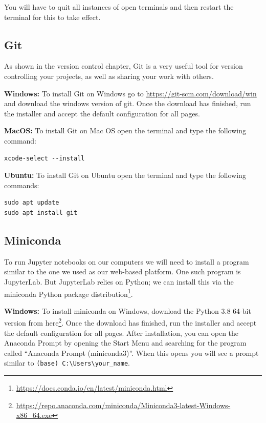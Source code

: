 \documentclass[
]{krantz}
\renewcommand{\href}[2]{#2\footnote{\url{#1}}}
\begin{document}
You will have to quit all instances of open terminals and then restart the
terminal for this to take effect.

\hypertarget{git}{%
\subsection{Git}\label{git}}

As shown in the version control chapter, Git is a very useful tool for version
controlling your projects, as well as sharing your work with others.

\textbf{Windows:} To install
Git on Windows go to \url{https://git-scm.com/download/win} and download the windows
version of git. Once the download has finished, run the installer and accept
the default configuration for all pages.

\textbf{MacOS:} To install Git on Mac OS open the terminal and type the following command:

\begin{verbatim}
xcode-select --install
\end{verbatim}

\textbf{Ubuntu:} To install Git on Ubuntu open the terminal and type the following commands:

\begin{verbatim}
sudo apt update
sudo apt install git
\end{verbatim}

\hypertarget{miniconda}{%
\subsection{Miniconda}\label{miniconda}}

To run Jupyter notebooks on our computers we will need to install a program
similar to the one we used as our web-based platform. One such program is
JupyterLab. But JupyterLab relies on Python; we can install this via
the \href{https://docs.conda.io/en/latest/miniconda.html}{miniconda Python package distribution}.

\textbf{Windows:} To install miniconda on Windows, download
the \href{https://repo.anaconda.com/miniconda/Miniconda3-latest-Windows-x86_64.exe}{Python 3.8 64-bit version from here}.
Once the download has finished, run the installer and accept the default
configuration for all pages. After installation, you can open the Anaconda Prompt
by opening the Start Menu and searching for the program called
``Anaconda Prompt (miniconda3)''. When this opens you will see a prompt similar to
\texttt{(base)\ C:\textbackslash{}Users\textbackslash{}your\_name}.
\end{document}
